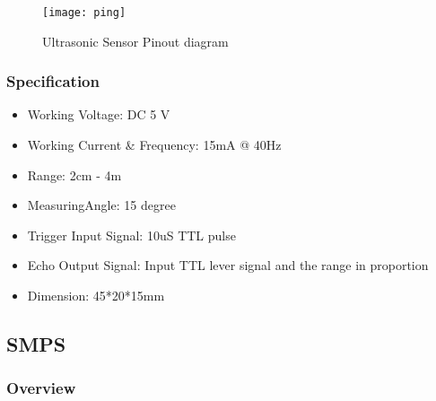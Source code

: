 \begin{figure}
    \centering
        \texttt{[image: ping]}
        \caption{Ultrasonic Sensor Pinout diagram}
        \label{fig:ping}
\end{figure}

\subsubsection{Specification}
\begin{itemize}
    \item Working Voltage: DC 5 V
    \item Working Current \& Frequency: 15mA @ 40Hz
    \item Range: 2cm - 4m 
    \item MeasuringAngle: 15 degree
    \item Trigger Input Signal: 10uS TTL pulse
    \item Echo Output Signal: Input TTL lever signal and the range in proportion
    \item Dimension: 45*20*15mm 
\end{itemize}

\newpage
\subsection{SMPS}
\subsubsection{Overview}


